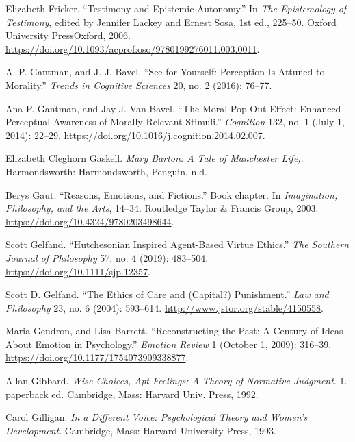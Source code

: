 \documentclass[phdthesis,12pt,final,a4paper]{wuthesis}
\newlength{\cslhangindent}
\newenvironment{CSLReferences}[2] %
{\begin{list}{}{%
	\setlength{\itemindent}{0pt}
	\setlength{\leftmargin}{0pt}
	\setlength{\parsep}{0pt}
	\ifodd #1
	\setlength{\leftmargin}{\cslhangindent}
	\setlength{\itemindent}{-1\cslhangindent}
	\fi
	\setlength{\itemsep}{#2\baselineskip}}}
{\end{list}}
\theoremstyle{definition}
\theoremstyle{definition}
\theoremstyle{definition}
\theoremstyle{definition}
\theoremstyle{remark}
\begin{document}
\begin{CSLReferences}{1}{0}
Elizabeth Fricker. {``Testimony and {Epistemic Autonomy}.''} In \emph{The {Epistemology} of {Testimony}}, edited by Jennifer Lackey and Ernest Sosa, 1st ed., 225--50. Oxford University PressOxford, 2006. \url{https://doi.org/10.1093/acprof:oso/9780199276011.003.0011}.

A. P. Gantman, and J. J. Bavel. {``See for Yourself: Perception Is Attuned to Morality.''} \emph{Trends in Cognitive Sciences} 20, no. 2 (2016): 76--77.

Ana P. Gantman, and Jay J. Van Bavel. {``The Moral Pop-Out Effect: {Enhanced} Perceptual Awareness of Morally Relevant Stimuli.''} \emph{Cognition} 132, no. 1 (July 1, 2014): 22--29. \url{https://doi.org/10.1016/j.cognition.2014.02.007}.

Elizabeth Cleghorn Gaskell. \emph{Mary Barton: A Tale of Manchester Life,}. Harmondsworth: Harmondsworth, Penguin, n.d.

Berys Gaut. {``Reasons, Emotions, and Fictions.''} Book chapter. In \emph{Imagination, {Philosophy}, and the {Arts}}, 14--34. Routledge Taylor \& Francis Group, 2003. \url{https://doi.org/10.4324/9780203498644}.

Scott Gelfand. {``Hutchesonian Inspired Agent-Based Virtue Ethics.''} \emph{The Southern Journal of Philosophy} 57, no. 4 (2019): 483--504. \url{https://doi.org/10.1111/sjp.12357}.

Scott D. Gelfand. {``The {Ethics} of {Care} and ({Capital}?) {Punishment}.''} \emph{Law and Philosophy} 23, no. 6 (2004): 593--614. \url{http://www.jstor.org/stable/4150558}.

Maria Gendron, and Lisa Barrett. {``Reconstructing the {Past}: {A Century} of {Ideas About Emotion} in {Psychology}.''} \emph{Emotion Review} 1 (October 1, 2009): 316--39. \url{https://doi.org/10.1177/1754073909338877}.

Allan Gibbard. \emph{Wise Choices, Apt Feelings: A Theory of Normative Judgment}. 1. paperback ed. Cambridge, Mass: Harvard Univ. Press, 1992.

Carol Gilligan. \emph{In a Different Voice: Psychological Theory and Women's Development}. Cambridge, Mass: Harvard University Press, 1993.


\end{CSLReferences}
\end{document}
